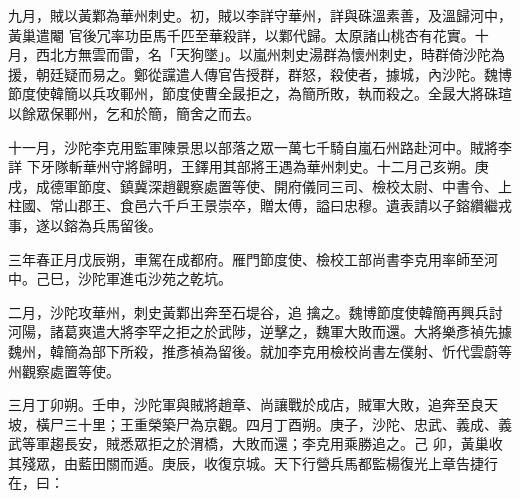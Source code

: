 \begin{pinyinscope}
 九月，賊以黃鄴為華州刺史。初，賊以李詳守華州，詳與硃溫素善，及溫歸河中，黃巢遣閹
 官後冗率功臣馬千匹至華殺詳，以鄴代歸。太原諸山桃杏有花實。十月，西北方無雲而雷，名「天狗墜」。以嵐州刺史湯群為懷州刺史，時群倚沙陀為援，朝廷疑而易之。鄭從讜遣人傳官告授群，群怒，殺使者，據城，內沙陀。魏博節度使韓簡以兵攻鄆州，節度使曹全晸拒之，為簡所敗，執而殺之。全晸大將硃瑄以餘眾保鄆州，乞和於簡，簡舍之而去。



 十一月，沙陀李克用監軍陳景思以部落之眾一萬七千騎自嵐石州路赴河中。賊將李詳
 下牙隊斬華州守將歸明，王鐸用其部將王遇為華州刺史。十二月己亥朔。庚戌，成德軍節度、鎮冀深趙觀察處置等使、開府儀同三司、檢校太尉、中書令、上柱國、常山郡王、食邑六千戶王景崇卒，贈太傅，謚曰忠穆。遺表請以子鎔纘繼戎事，遂以鎔為兵馬留後。



 三年春正月戊辰朔，車駕在成都府。雁門節度使、檢校工部尚書李克用率師至河中。己巳，沙陀軍進屯沙苑之乾坑。



 二月，沙陀攻華州，刺史黃鄴出奔至石堤谷，追
 擒之。魏博節度使韓簡再興兵討河陽，諸葛爽遣大將李罕之拒之於武陟，逆擊之，魏軍大敗而還。大將樂彥禎先據魏州，韓簡為部下所殺，推彥禎為留後。就加李克用檢校尚書左僕射、忻代雲蔚等州觀察處置等使。



 三月丁卯朔。壬申，沙陀軍與賊將趙章、尚讓戰於成店，賊軍大敗，追奔至良天坡，橫尸三十里；王重榮築尸為京觀。四月丁酉朔。庚子，沙陀、忠武、義成、義武等軍趨長安，賊悉眾拒之於渭橋，大敗而還；李克用乘勝追之。己
 卯，黃巢收其殘眾，由藍田關而遁。庚辰，收復京城。天下行營兵馬都監楊復光上章告捷行在，曰：




\end{pinyinscope}
